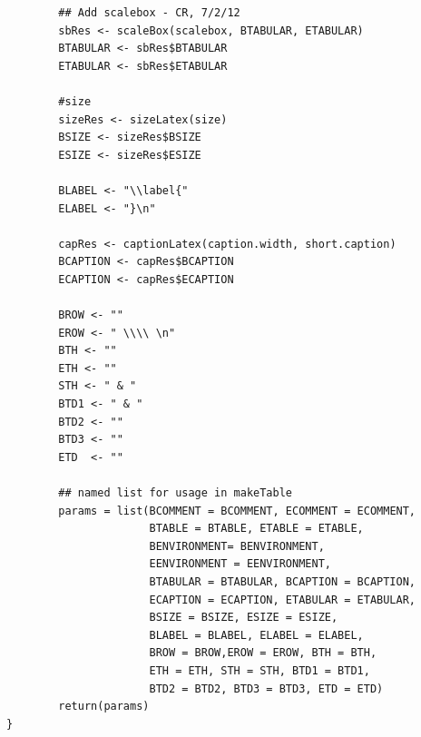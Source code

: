 \documentclass{memoir}\usepackage[]{graphicx}\usepackage[]{color}
\begin{document}
\begin{lstlisting}
        ## Add scalebox - CR, 7/2/12
        sbRes <- scaleBox(scalebox, BTABULAR, ETABULAR)
        BTABULAR <- sbRes$BTABULAR
        ETABULAR <- sbRes$ETABULAR

        #size
        sizeRes <- sizeLatex(size)
        BSIZE <- sizeRes$BSIZE
        ESIZE <- sizeRes$ESIZE

        BLABEL <- "\\label{"
        ELABEL <- "}\n"

        capRes <- captionLatex(caption.width, short.caption)
        BCAPTION <- capRes$BCAPTION
        ECAPTION <- capRes$ECAPTION

        BROW <- ""
        EROW <- " \\\\ \n"
        BTH <- ""
        ETH <- ""
        STH <- " & "
        BTD1 <- " & "
        BTD2 <- ""
        BTD3 <- ""
        ETD  <- ""

        ## named list for usage in makeTable
        params = list(BCOMMENT = BCOMMENT, ECOMMENT = ECOMMENT, 
                      BTABLE = BTABLE, ETABLE = ETABLE, 
                      BENVIRONMENT= BENVIRONMENT, 
                      EENVIRONMENT = EENVIRONMENT, 
                      BTABULAR = BTABULAR, BCAPTION = BCAPTION, 
                      ECAPTION = ECAPTION, ETABULAR = ETABULAR,
                      BSIZE = BSIZE, ESIZE = ESIZE, 
                      BLABEL = BLABEL, ELABEL = ELABEL, 
                      BROW = BROW,EROW = EROW, BTH = BTH, 
                      ETH = ETH, STH = STH, BTD1 = BTD1, 
                      BTD2 = BTD2, BTD3 = BTD3, ETD = ETD)
        return(params)
} 



\end{lstlisting}
\end{document}
